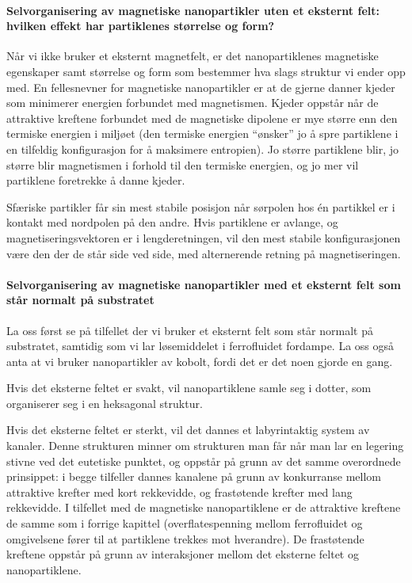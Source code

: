 \paragraph{Selvorganisering av magnetiske nanopartikler uten et eksternt felt: hvilken effekt har partiklenes størrelse og form?} Når vi ikke bruker et eksternt magnetfelt, er det nanopartiklenes magnetiske egenskaper samt størrelse og form som bestemmer hva slags struktur vi ender opp med. En fellesnevner for magnetiske nanopartikler er at de gjerne danner kjeder som minimerer energien forbundet med magnetismen. Kjeder oppstår når de attraktive kreftene forbundet med de magnetiske dipolene er mye større enn den termiske energien i miljøet (den termiske energien ``ønsker'' jo å spre partiklene i en tilfeldig konfigurasjon for å maksimere entropien). Jo større partiklene blir, jo større blir magnetismen i forhold til den termiske energien, og jo mer vil partiklene foretrekke å danne kjeder.

Sfæriske partikler får sin mest stabile posisjon når sørpolen hos én partikkel er i kontakt med nordpolen på den andre. Hvis partiklene er avlange, og magnetiseringsvektoren er i lengderetningen, vil den mest stabile konfigurasjonen være den der de står side ved side, med alternerende retning på magnetiseringen.

\paragraph{Selvorganisering av magnetiske nanopartikler med et eksternt felt som står normalt på substratet} La oss først se på tilfellet der vi bruker et eksternt felt som står normalt på substratet, samtidig som vi lar løsemiddelet i ferrofluidet fordampe. La oss også anta at vi bruker nanopartikler av kobolt, fordi det er det noen gjorde en gang. 

Hvis det eksterne feltet er svakt, vil nanopartiklene samle seg i dotter, som organiserer seg i en heksagonal struktur.

Hvis det eksterne feltet er sterkt, vil det dannes et labyrintaktig system av kanaler. Denne strukturen minner om strukturen man får når man lar en legering stivne ved det eutetiske punktet, og oppstår på grunn av det samme overordnede prinsippet: i begge tilfeller dannes kanalene på grunn av konkurranse mellom attraktive krefter med kort rekkevidde, og frastøtende krefter med lang rekkevidde. I tilfellet med de magnetiske nanopartiklene er de attraktive kreftene de samme som i forrige kapittel (overflatespenning mellom ferrofluidet og omgivelsene fører til at partiklene trekkes mot hverandre). De frastøtende kreftene oppstår på grunn av interaksjoner mellom det eksterne feltet og nanopartiklene.

